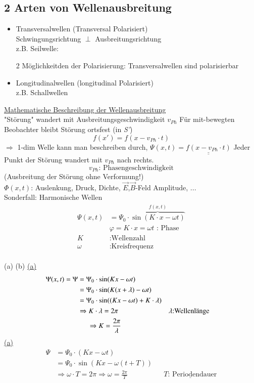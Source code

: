 \subsection{2 Arten von Wellenausbreitung}
\begin{itemize}
	\item Transversalwellen (Transversal Polarisiert) \\
	Schwingungsrichtung $ \perp $ Ausbreitungsrichtung\\
	z.B. Seilwelle:
	\bild
	\begin{center}
		
		2 Möglichkeitden der Polarisierung:
		\bild
		Transversalwellen sind polarisierbar
	\end{center}
	\item Longitudinalwellen (longitudinal Polarisiert)\\
	z.B. Schallwellen
	\bild
\end{itemize}

\underline{Mathematische Beschreibung der Wellenausbreitung}\break \\
"Störung" wandert mit Ausbreitungsgeschwindigkeit $ v_{Ph} $
\bild
\bild
Für mit-bewegten Beobachter bleibt Störung ortsfest (in \emph{S'})
$$ f(x')=f(x-v_{Ph}\cdot t) $$
$ \Rightarrow $ 1-dim Welle kann man beschreiben durch, $ \Psi(x,t) = \underline{\underline{f(x-v_{Ph} \cdot t)}} $ Jeder Punkt der Störung wandert mit $ v_{Ph} $ nach rechts. $$ v_{Ph} \text{: Phasengeschwindigkeit} $$
(Ausbreitung der Störung ohne Verformung!)\\
$ \Phi(x,t) $: Auslenkung, Druck, Dichte, $ \vec{E} $,$ \vec{B} $-Feld Amplitude, ...\\ \break
Sonderfall: Harmonische Wellen
\begin{align*}
\Psi(x,t) &= \Psi_0 \cdot \overbrace{\sin(K\cdot x -\omega t)}^{f(x,t)}\\
& \varphi = K \cdot x = \omega t \text{ : Phase}\\
K&: \text{Wellenzahl}\\
\omega&: \text{Kreisfrequenz}
\end{align*}
\hfill\\
\hypertarget{a}{(a)} \bild
\hypertarget{b}{(b)} \bild
\hyperlink{a}{(a)}
\begin{align*}
\Psi(x,t) = \Psi &= \Psi_0 \cdot \sin(Kx-\omega t)\\
&= \Psi_0 \cdot \sin(K(x+\lambda)-\omega t)\\
&= \Psi_0 \cdot \sin((Kx-\omega t)+K\cdot \lambda)\\
&\Rightarrow K \cdot \lambda = 2\pi &&\lambda \text{:Wellenlänge}\\
&\hspace{5mm} \Rightarrow K = \frac{2\pi}{\lambda}
\end{align*}
\hyperlink{a}{(a)}
\begin{align*}
\Psi &= \Psi_0 \cdot (Kx-\omega t)\\
&= \Psi_0 \cdot \sin(Kx-\omega (t+T))\\
&\Rightarrow\omega \cdot T = 2\pi \Rightarrow \omega = \frac{2\pi}{T} && \underline{T\text{: Periodendauer}}
\end{align*}

